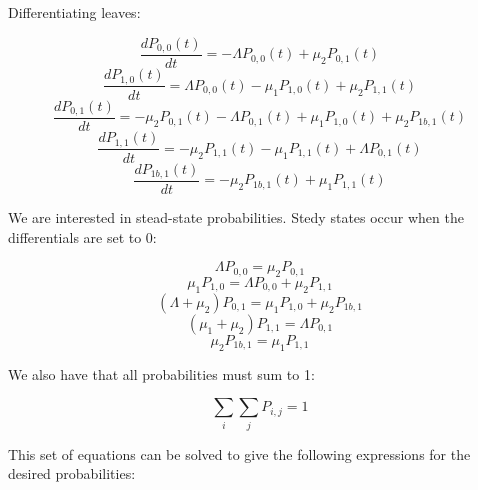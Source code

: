\documentclass{article}
\begin{document}
Differentiating leaves:

\begin{equation*}
    \frac{d P_{0,0}(t)}{dt} = - \Lambda P_{0,0}(t) + \mu_2 P_{0,1}(t)
\end{equation*}
\begin{equation*}
    \frac{d P_{1,0}(t)}{dt} = \Lambda P_{0,0}(t) - \mu_1 P_{1,0}(t) + \mu_2 P_{1,1}(t)
\end{equation*}
\begin{equation*}
    \frac{d P_{0,1}(t)}{dt} = - \mu_2 P_{0,1}(t) - \Lambda P_{0,1}(t) + \mu_1 P_{1,0}(t) + \mu_2 P_{1b,1}(t)
\end{equation*}
\begin{equation*}
    \frac{d P_{1,1}(t)}{dt} = - \mu_2 P_{1,1}(t) - \mu_1 P_{1,1}(t) + \Lambda P_{0,1}(t)
\end{equation*}
\begin{equation*}
    \frac{d P_{1b,1}(t)}{dt} = - \mu_2 P_{1b,1}(t) + \mu_1 P_{1,1}(t)
\end{equation*}

We are interested in stead-state probabilities. Stedy states occur when the differentials are set to 0:

\begin{equation*}
    \Lambda P_{0,0} = \mu_2 P_{0,1}
\end{equation*}
\begin{equation*}
    \mu_1 P_{1,0} = \Lambda P_{0,0} + \mu_2 P_{1,1}
\end{equation*}
\begin{equation*}
    (\Lambda + \mu_2) P_{0,1} = \mu_1 P_{1,0} + \mu_2 P_{1b,1}
\end{equation*}
\begin{equation*}
    (\mu_1 + \mu_2) P_{1,1} = \Lambda P_{0,1}
\end{equation*}
\begin{equation*}
    \mu_2 P_{1b,1} = \mu_1 P_{1,1}
\end{equation*}

We also have that all probabilities must sum to 1:

\begin{equation*}
    \sum_i \sum_j P_{i,j} = 1
\end{equation*}

This set of equations can be solved to give the following expressions for the desired probabilities:
\end{document}
